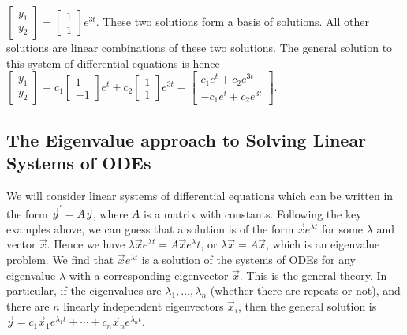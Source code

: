 \documentclass[10pt]{article}
\theoremstyle{plain}
\theoremstyle{box}
\begin{document}
$ \begin{bmatrix}y_1\\y_2\end{bmatrix} = \begin{bmatrix}1\\1\end{bmatrix}e^{3t}$. These two solutions form a basis of solutions. All other solutions are linear combinations of these two solutions. The general solution to this system of differential equations is hence $ \begin{bmatrix}y_1\\y_2\end{bmatrix} 
= c_1\begin{bmatrix}1\\-1\end{bmatrix}e^t 
+ c_2\begin{bmatrix}1\\1\end{bmatrix}e^{3t}
=
\begin{bmatrix}c_1e^t + c_2e^{3t}\\-c_1e^t + c_2e^{3t}\end{bmatrix}$. 

\subsection{The Eigenvalue approach to Solving Linear Systems of ODEs}

We will consider linear systems of differential equations which can be written in the form $\vec y^\prime = A\vec y$, where $A$ is a matrix with constants.  Following the key examples above, we can guess that a solution is of the form $\vec xe^{\lambda t}$ for some $\lambda$ and vector $\vec x$. Hence we have $\lambda \vec x e^{\lambda t}=A\vec x e^\lambda t $, or $\lambda \vec x =A\vec x $, which is an eigenvalue problem. We find that $\vec x e^{\lambda t}$ is a solution of the systems of ODEs for any eigenvalue $\lambda$ with a corresponding eigenvector $\vec x$. This is the general theory.  In particular, if the eigenvalues are $\lambda_1,\ldots,\lambda_n$ (whether there are repeats or not), and there are $n$ linearly independent eigenvectors $\vec x_{i}$, then the general solution is $\vec y = c_1\vec x_{1} e^{\lambda_1 t} + \cdots + c_n\vec x_{n} e^{\lambda_n t}$. 
\end{document}
